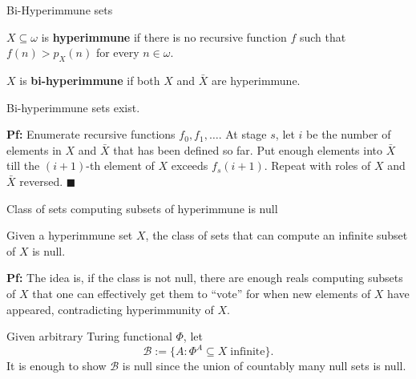 \begin{frame}{Bi-Hyperimmune sets}
  \begin{define}
    $X\subseteq\omega$ is \textbf{hyperimmune} if there is no recursive
    function $f$ such that $f(n)>p_X(n)$ for every $n\in\omega$.
  \end{define}

  \begin{define}
    $X$ is \textbf{bi-hyperimmune} if both $X$ and $\bar{X}$ are hyperimmune.
  \end{define}

  \begin{thm}
    Bi-hyperimmune sets exist.
  \end{thm}

  \vspace{0.5em}
  \textbf{Pf:} Enumerate recursive functions $f_0,f_1,\ldots$. At stage
  $s$, let $i$ be the number of elements in $X$ and $\bar{X}$ that has been
  defined so far. Put enough elements into $\bar{X}$ till the $(i+1)$-th
  element of $X$ exceeds $f_s(i+1)$. Repeat with roles of $X$ and $\bar{X}$
  reversed. $\blacksquare$
\end{frame}

\begin{frame}{Class of sets computing subsets of hyperimmune is null}
  \begin{thm}
    \label{thm:bihyper-null}
    Given a hyperimmune set $X$, the class of sets that can compute an
    infinite subset of $X$ is null.
  \end{thm}

  \vspace{1em}
  \textbf{Pf:} The idea is, if the class is not null, there are enough
  reals computing subsets of $X$ that one can effectively get them to
  ``vote'' for when new elements of $X$ have appeared, contradicting
  hyperimmunity of $X$.

  \vspace{1em}
  Given arbitrary Turing functional $\Phi$, let
  \[\mathcal{B} :=\{A: \Phi^A \subseteq X\; \text{infinite}\}.\]
  It is enough to show $\mathcal{B}$ is null since the union of countably
  many null sets is null.
\end{frame}

